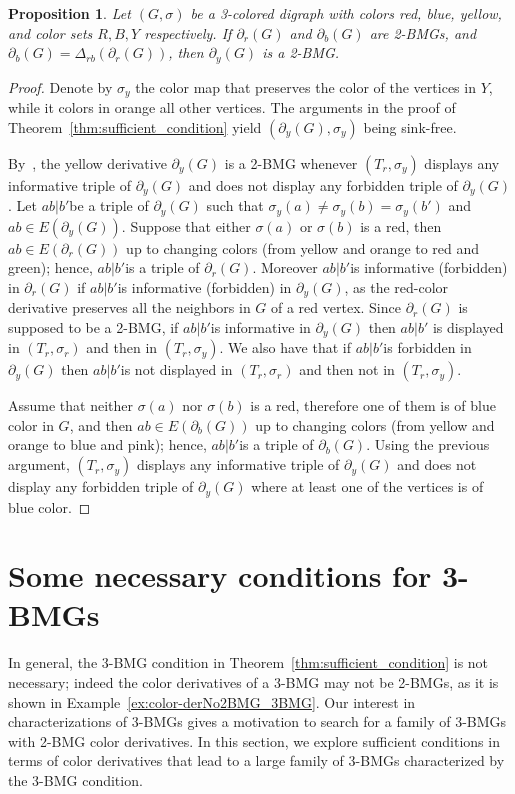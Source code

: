 \documentclass[final,3p,times]{elsarticle}
\newtheorem{proposition}[theorem]{Proposition}%
\begin{document}
\begin{proposition}\label{prop:yellow-derv}
Let $(G,\sigma)$ be a 3-colored digraph with colors red, blue, yellow, and color sets $R,B,Y$ respectively. If $\partial_r(G)$ and $\partial_b(G)$ are 2-BMGs, and $\partial_b(G)=\Delta_{rb}(\partial_r(G))$, then $\partial_{y}(G)$ is a 2-BMG.
\end{proposition}
\begin{proof}
Denote by $\sigma_y$ the color map that preserves the color of the vertices in $Y$, while it colors in orange all other vertices.
The arguments in the proof of Theorem~\ref{thm:sufficient_condition} yield $(\partial_{y}(G),\sigma_y)$ being sink-free. 

By~\cite[Proposition~2.3]{korchmaros2021quasi}, the yellow derivative $\partial_{y}(G)$ is a 2-BMG whenever $(T_r,\sigma_y)$ displays any informative triple of $\partial_{y}(G)$ and does not display any forbidden triple of $\partial_{y}(G)$. Let $ab|b'$be a triple of $\partial_{y}(G)$ such that $\sigma_y(a)\ne \sigma_y(b)=\sigma_y(b')$ and $ab\in E(\partial_{y}(G))$. Suppose that either $\sigma(a)$ or $\sigma(b)$ is a red, then $ab\in E(\partial_{r}(G))$ up to changing colors (from yellow and orange to red and green); hence, $ab|b'$is a triple of $\partial_{r}(G)$. Moreover $ab|b'$is informative (forbidden) in $\partial_{r}(G)$ if $ab|b'$is informative (forbidden) in $\partial_{y}(G)$, as the red-color derivative preserves all the neighbors in $G$ of a red vertex. Since $\partial_{r}(G)$ is supposed to be a 2-BMG, if $ab|b'$is informative in $\partial_{y}(G)$ then $ab|b'$ is displayed in $(T_r,\sigma_r)$ and then in $(T_r,\sigma_y)$. We also have that if $ab|b'$is forbidden in $\partial_{y}(G)$ then $ab|b'$is not displayed in $(T_r,\sigma_r)$ and then not in $(T_r,\sigma_y)$.

Assume that neither $\sigma(a)$ nor $\sigma(b)$ is a red, therefore one of them is of blue color in $G$, and then $ab\in E(\partial_{b}(G))$ up to changing colors (from yellow and orange to blue and pink); hence, $ab|b'$is a triple of $\partial_{b}(G)$. Using the previous argument, $(T_r,\sigma_y)$ displays any informative triple of $\partial_{y}(G)$ and does not display any forbidden triple of $\partial_{y}(G)$ where at least one of the vertices is of blue color.
\end{proof}

\section{Some necessary conditions for 3-BMGs}
\label{sec:nec_condition}
In general, the 3-BMG condition in Theorem~\ref{thm:sufficient_condition} is not necessary; indeed the color derivatives of a 3-BMG may not be 2-BMGs, as it is shown in Example~\ref{ex:color-derNo2BMG_3BMG}. 
Our interest in characterizations of 3-BMGs gives a motivation to search for a family of 3-BMGs with 2-BMG color derivatives.
In this section, we explore sufficient conditions in terms of color derivatives that lead to a large family of 3-BMGs characterized by the 3-BMG condition. 
\end{document}
